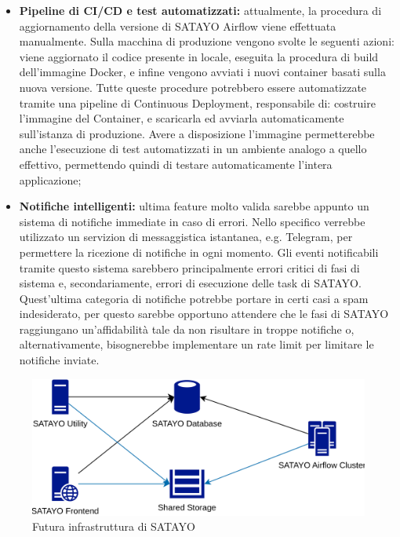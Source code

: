 \begin{itemize}
  \item \textbf{Pipeline di CI/CD e test automatizzati:} attualmente, la procedura
    di aggiornamento della versione di SATAYO Airflow viene effettuata manualmente.
    Sulla macchina di produzione vengono svolte le seguenti azioni: viene aggiornato
    il codice presente in locale, eseguita la procedura di build dell'immagine
    Docker, e infine vengono avviati i nuovi container basati sulla nuova versione.
    Tutte queste procedure potrebbero essere automatizzate tramite una pipeline
    di Continuous Deployment, responsabile di: costruire l'immagine del
    Container, e scaricarla ed avviarla automaticamente sull'istanza di produzione.
    Avere a disposizione l'immagine permetterebbe anche l'esecuzione di test
    automatizzati in un ambiente analogo a quello effettivo, permettendo quindi di
    testare automaticamente l'intera applicazione;

  \item \textbf{Notifiche intelligenti:} ultima feature molto valida sarebbe
    appunto un sistema di notifiche immediate in caso di errori. Nello specifico
    verrebbe utilizzato un servizion di messaggistica istantanea, e.g. Telegram,
    per permettere la ricezione di notifiche in ogni momento. Gli eventi notificabili
    tramite questo sistema sarebbero principalmente errori critici di fasi di sistema
    e, secondariamente, errori di esecuzione delle task di SATAYO. Quest'ultima
    categoria di notifiche potrebbe portare in certi casi a spam indesiderato, per
    questo sarebbe opportuno attendere che le fasi di SATAYO raggiungano un'affidabilità
    tale da non risultare in troppe notifiche o, alternativamente, bisognerebbe implementare
    un rate limit per limitare le notifiche inviate.
\end{itemize}

\begin{figure}[htbp]
  \centering
  \includegraphics[width=.6\linewidth]{images/SATAYO_infrastructure_future.png}
  \caption{Futura infrastruttura di SATAYO}
  \label{fig:infra_future}
\end{figure}